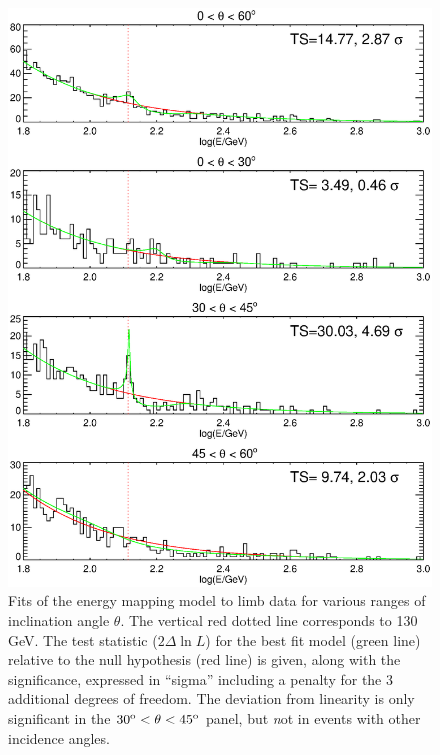 \documentclass[aps,twocolumn,prd,superscriptaddress,showpacs,nofootinbib,fixfloat]{revtex4}
\newcommand{\degree}{^{\rm o}}
\begin{document}
\begin{figure}
  \centering
  \includegraphics[width=1.0\linewidth]{plots/limbfits.ps}
  \caption{Fits of the energy mapping model to limb data for
  various ranges of inclination angle $\theta$.  The
  vertical red dotted line corresponds to 130 GeV.  The test
  statistic ($2\Delta\ln L$) for the best fit model (green
  line) relative to the null hypothesis (red line) is given,
  along with the significance, expressed in ``sigma''
  including a penalty for the 3 additional degrees of
  freedom.  The deviation from linearity is only significant
  in the $30\degree < \theta < 45\degree$ panel, but {\emph not} in events with other incidence angles.}
  \label{fig:limbfits}
\end{figure}
\end{document}
